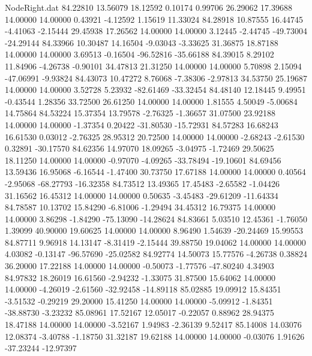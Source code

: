 \begin{filecontents}{NodeRight.dat}
  84.22810   13.56079   18.12592     0.10174    0.99706   26.29062   17.39688   14.00000   14.00000    0.43921   -4.12592    1.15619   11.33024
  84.28918   10.87555   16.44745    -4.41063   -2.15444   29.45938   17.26562   14.00000   14.00000    3.12445   -2.44745  -49.73004  -24.29144
  84.33966   10.30487   14.16504    -9.03043   -3.33625   31.36875   18.87188   14.00000   14.00000    3.69513   -0.16504  -96.52816  -35.66188
  84.39015    8.29102   11.84906    -4.26738   -0.90101   34.47813   21.31250   14.00000   14.00000    5.70898    2.15094  -47.06991   -9.93824
  84.43073   10.47272    8.76068    -7.38306   -2.97813   34.53750   25.19687   14.00000   14.00000    3.52728    5.23932  -82.61469  -33.32454
  84.48140   12.18445    9.49951    -0.43544    1.28356   33.72500   26.61250   14.00000   14.00000    1.81555    4.50049   -5.00684   14.75864
  84.53224   15.37354   13.79578    -2.76325   -1.36657   31.07500   23.92188   14.00000   14.00000   -1.37354    0.20422  -31.80530  -15.72931
  84.57283   16.68243   16.61530     0.03012   -2.76325   28.95312   20.72500   14.00000   14.00000   -2.68243   -2.61530    0.32891  -30.17570
  84.62356   14.97070   18.09265    -3.04975   -1.72469   29.50625   18.11250   14.00000   14.00000   -0.97070   -4.09265  -33.78494  -19.10601
  84.69456   13.59436   16.95068    -6.16544   -1.47400   30.73750   17.67188   14.00000   14.00000    0.40564   -2.95068  -68.27793  -16.32358
  84.73512   13.49365   17.45483    -2.65582   -1.04426   31.16562   16.45312   14.00000   14.00000    0.50635   -3.45483  -29.61209  -11.64334
  84.78587   10.13702   15.84290    -6.81006   -1.29494   34.45312   16.79375   14.00000   14.00000    3.86298   -1.84290  -75.13090  -14.28624
  84.83661    5.03510   12.45361    -1.76050    1.39099   40.90000   19.60625   14.00000   14.00000    8.96490    1.54639  -20.24469   15.99553
  84.87711    9.96918   14.13147    -8.31419   -2.15444   39.88750   19.04062   14.00000   14.00000    4.03082   -0.13147  -96.57690  -25.02582
  84.92774   14.50073   15.77576    -4.26738    0.38824   36.20000   17.22188   14.00000   14.00000   -0.50073   -1.77576  -47.80240    4.34903
  84.97832   18.26019   16.61560    -2.94232   -1.33075   31.87500   15.64062   14.00000   14.00000   -4.26019   -2.61560  -32.92458  -14.89118
  85.02885   19.09912   15.84351    -3.51532   -0.29219   29.20000   15.41250   14.00000   14.00000   -5.09912   -1.84351  -38.88730   -3.23232
  85.08961   17.52167   12.05017    -0.22057    0.88962   28.94375   18.47188   14.00000   14.00000   -3.52167    1.94983   -2.36139    9.52417
  85.14008   14.03076   12.08374    -3.40788   -1.18750   31.32187   19.62188   14.00000   14.00000   -0.03076    1.91626  -37.23244  -12.97397

\end{filecontents}
